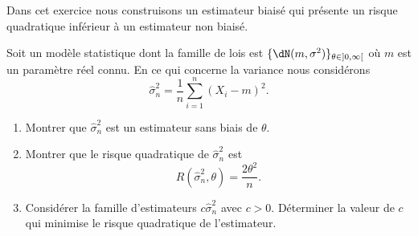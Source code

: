 \begin{example}
	Dans cet exercice nous construisons un estimateur biaisé qui présente un risque quadratique inférieur à un estimateur non biaisé.

	Soit un modèle statistique dont la famille de lois est \( \{ \dN(m,\sigma^2) \}_{\theta\in\mathopen] 0 , \infty \mathclose[}\) où \( m\) est un paramètre réel connu. En ce qui concerne la variance nous considérons
	\begin{equation}
		\hat\sigma_n^2=\frac{1}{ n }\sum_{i=1}^n(X_i-m)^2.
	\end{equation}
	\begin{enumerate}
		\item
		      Montrer que \( \hat\sigma_n^2\) est un estimateur sans biais de \( \theta\).
		\item
		      Montrer que le risque quadratique de \( \hat\sigma_n^2\) est
		      \begin{equation}
			      R(\hat\sigma_n^2,\theta)=\frac{ 2\theta^2 }{ n }.
		      \end{equation}
		\item
		      Considérer la famille d'estimateurs \( c\hat\sigma_n^2\) avec \( c>0\). Déterminer la valeur de \( c\) qui minimise le risque quadratique de l'estimateur.
	\end{enumerate}


\end{example}
